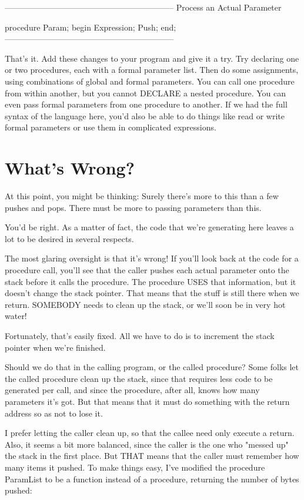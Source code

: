 \documentclass[float=false, crop=false]{standalone}
\begin{document}
{--------------------------------------------------------------}
{ Process an Actual Parameter }

procedure Param;
begin
     Expression;
     Push;
end;
{--------------------------------------------------------------}


That's it. Add these changes to your program and give it a try. Try declaring
one or two procedures, each with a formal parameter list. Then do some
assignments, using combinations of global and formal parameters. You can call
one procedure from within another, but you cannot DECLARE a nested procedure.
You can even pass formal parameters from one procedure to another. If we had the
full syntax of the language here, you'd also be able to do things like read or
write formal parameters or use them in complicated expressions.


\section{What's Wrong?}

At this point, you might be thinking: Surely there's more to this than a few
pushes and pops. There must be more to passing parameters than this.

You'd be right. As a matter of fact, the code that we're generating here leaves
a lot to be desired in several respects.

The most glaring oversight is that it's wrong! If you'll look back at the code
for a procedure call, you'll see that the caller pushes each actual parameter
onto the stack before it calls the procedure. The procedure USES that
information, but it doesn't change the stack pointer. That means that the stuff
is still there when we return. SOMEBODY needs to clean up the stack, or we'll
soon be in very hot water!

Fortunately, that's easily fixed. All we have to do is to increment the stack
pointer when we're finished.

Should we do that in the calling program, or the called procedure? Some folks
let the called procedure clean up the stack, since that requires less code to be
generated per call, and since the procedure, after all, knows how many
parameters it's got. But that means that it must do something with the return
address so as not to lose it.

I prefer letting the caller clean up, so that the callee need only execute a
return. Also, it seems a bit more balanced, since the caller is the one who
"messed up" the stack in the first place. But THAT means that the caller must
remember how many items it pushed. To make things easy, I've modified the
procedure ParamList to be a function instead of a procedure, returning the
number of bytes pushed:
\end{document}
